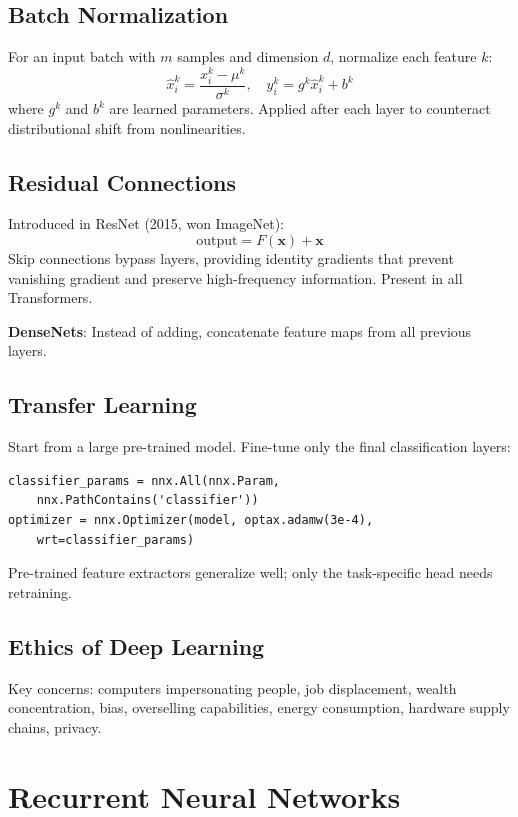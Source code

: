 \documentclass[11pt]{article}
\begin{document}
\subsection{Batch Normalization}
For an input batch with $m$ samples and dimension $d$, normalize each feature $k$:
\[
  \hat{x}_i^k = \frac{x_i^k - \mu^k}{\sigma^k}, \quad y_i^k = g^k \hat{x}_i^k + b^k
\]
where $g^k$ and $b^k$ are learned parameters. Applied after each layer to counteract distributional shift from nonlinearities.

\subsection{Residual Connections}
Introduced in ResNet (2015, won ImageNet):
\[
  \text{output} = F(\mathbf{x}) + \mathbf{x}
\]
Skip connections bypass layers, providing identity gradients that prevent vanishing gradient and preserve high-frequency information. Present in all Transformers.

\textbf{DenseNets}: Instead of adding, concatenate feature maps from all previous layers.

\subsection{Transfer Learning}
Start from a large pre-trained model. Fine-tune only the final classification layers:
\begin{lstlisting}
classifier_params = nnx.All(nnx.Param,
    nnx.PathContains('classifier'))
optimizer = nnx.Optimizer(model, optax.adamw(3e-4),
    wrt=classifier_params)
\end{lstlisting}
Pre-trained feature extractors generalize well; only the task-specific head needs retraining.

\subsection{Ethics of Deep Learning}
Key concerns: computers impersonating people, job displacement, wealth concentration, bias, overselling capabilities, energy consumption, hardware supply chains, privacy.

\section{Recurrent Neural Networks}
\end{document}
